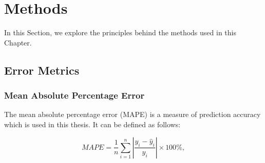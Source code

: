 \section{Methods}
\label{forecast:sec:methods}

In this Section, we explore the principles behind the methods used in this Chapter. 




%
%
%
%

\subsection{Error Metrics}

\subsubsection{Mean Absolute Percentage Error}

The mean absolute percentage error (MAPE) is a measure of prediction accuracy which is used in this thesis. It can be defined as follows:

\begin{equation}
MAPE=\frac{1}{n}\sum_{i=1}^n\left|\frac{y_i-\hat{y}_i}{y_i}\right|\times 100\%,
\end{equation}

